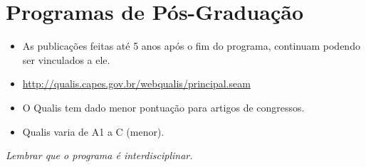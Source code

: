 
\section{Programas de Pós-Graduação} 

    \begin{itemize}
        \item As publicações feitas até 5 anos após o fim do programa, continuam podendo ser vinculados a ele.
        \item \url{http://qualis.capes.gov.br/webqualis/principal.seam}
        \item O Qualis tem dado menor pontuação para artigos de congressos.
        \item Qualis varia de A1 a C (menor).
    \end{itemize}

    \textit{Lembrar que o programa é interdisciplinar.}